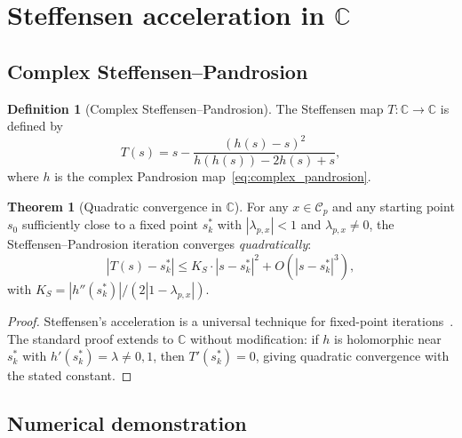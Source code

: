 \documentclass[11pt,a4paper]{article}
\theoremstyle{definition}
\newtheorem{definition}{Definition}[section]
\newtheorem{theorem}{Theorem}[section]
\newcommand{\CC}{\mathbb{C}}
\begin{document}
\section{Steffensen acceleration in \texorpdfstring{$\CC$}{C}}
\label{sec:steffensen_complex}

\subsection{Complex Steffensen--Pandrosion}

\begin{definition}[Complex Steffensen--Pandrosion]
The Steffensen map $T : \CC \to \CC$ is defined by
\begin{equation}
  \label{eq:steffensen_complex}
  T(s) = s - \frac{(h(s) - s)^2}{h(h(s)) - 2h(s) + s},
\end{equation}
where $h$ is the complex Pandrosion map~\eqref{eq:complex_pandrosion}.
\end{definition}

\begin{theorem}[Quadratic convergence in $\CC$]
\label{thm:steffensen_complex}
For any $x \in \mathcal{C}_p$ and any starting point $s_0$ sufficiently close to a fixed point $s_k^*$ with $|\lambda_{p,x}| < 1$ and $\lambda_{p,x} \neq 0$, the Steffensen--Pandrosion iteration converges \emph{quadratically}:
\[
  |T(s) - s_k^*| \leq K_S \cdot |s - s_k^*|^2 + O(|s - s_k^*|^3),
\]
with $K_S = |h''(s_k^*)| / (2|1 - \lambda_{p,x}|)$.
\end{theorem}

\begin{proof}
Steffensen's acceleration is a universal technique for fixed-point iterations~\cite{stoer}.  The standard proof extends to $\CC$ without modification: if $h$ is holomorphic near $s_k^*$ with $h'(s_k^*) = \lambda \neq 0, 1$, then $T'(s_k^*) = 0$, giving quadratic convergence with the stated constant.
\end{proof}

\subsection{Numerical demonstration}
\end{document}
